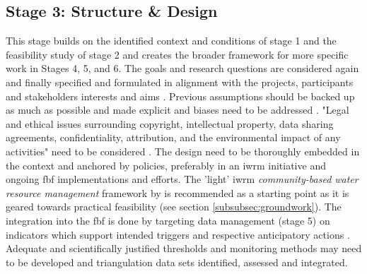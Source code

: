 \subsection{Stage 3: Structure \& Design}\label{subsec:stage3_design}
This stage builds on the identified context and conditions of stage 1 and the feasibility study of stage 2 and creates the broader framework for more specific work in Stages 4, 5, and 6. The goals and research questions are considered again and finally specified and formulated in alignment with the projects, participants and stakeholders interests and aims \autocite{conradReviewCitizenScience2011,fraislCitizenScienceEnvironmental2022,minkmanCitizenScienceWater2015}. Previous assumptions should be backed up as much as possible and made explicit \autocite{silvertownNewDawnCitizen2009} and biases need to be addressed \autocite{escaeuropeancitizenscienceassociationTenPrinciplesCitizen2015,fraislCitizenScienceEnvironmental2022}. "Legal and ethical issues surrounding copyright, intellectual property, data sharing agreements, confidentiality, attribution, and the environmental impact of any activities" need to be considered \autocite{escaeuropeancitizenscienceassociationTenPrinciplesCitizen2015}. The design need to be thoroughly embedded in the context and anchored by policies, preferably in an \acrlong{iwrm} initiative \autocite{cervoniImplementingIntegratedWater2008,sharpeCommunityBasedEcological2006} and ongoing \acrshort{fbf} implementations and efforts. The 'light' \acrshort{iwrm} \textit{community-based water resource management} framework by \autocite{dayCommunitybasedWaterResources2009} is recommended as a starting point as it is geared towards practical feasibility (see section \ref{subsubsec:groundwork}). The integration into the \acrshort{fbf} is done by targeting data management (stage 5) on indicators which support intended triggers and respective anticipatory actions \autocite{ifrcCommunityBasedSurveillanceGuiding2017}. Adequate and scientifically justified thresholds and monitoring methods may need to be developed and triangulation data sets identified, assessed and integrated. \newline
